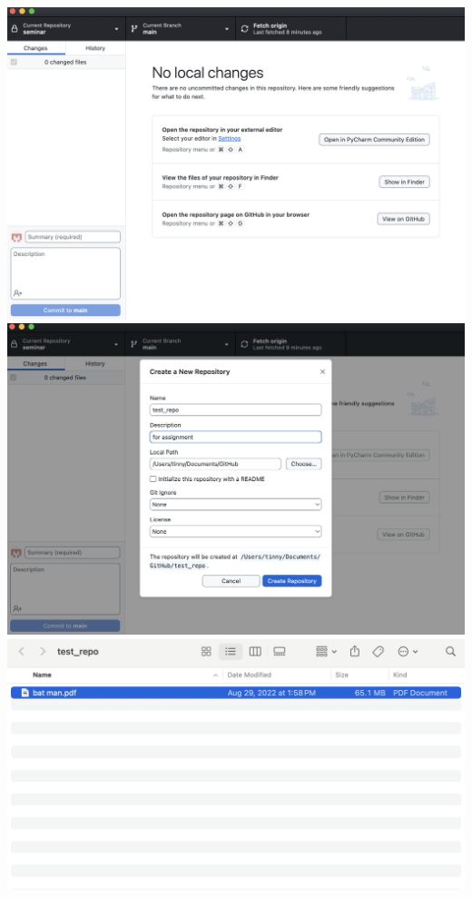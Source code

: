 \documentclass[10pt,twocolumn]{article}
\begin{document}
\begin{enumerate}
\includegraphics[width=\linewidth]{1.png}
\includegraphics[width=\linewidth]{2.png}
\includegraphics[width=\linewidth]{3.png}

\end{enumerate}
\end{document}
